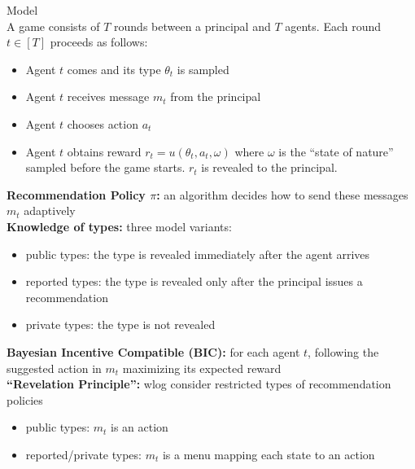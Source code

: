 \documentclass[final]{beamer}
\newlength{\onecolwid}
\begin{document}
\begin{frame}[t]
\begin{columns}[t]
\begin{column}{\onecolwid}
\begin{block}{Model}
~\\
A game consists of $T$ rounds between a principal and $T$ agents. Each round $t \in[T]$ proceeds as follows:
\begin{itemize}
\item Agent $t$ comes and its type $\theta_t$ is sampled
\item Agent $t$ receives message $m_t$ from the principal
\item Agent $t$ chooses action $a_t$
\item Agent $t$ obtains reward $r_t = u(\theta_t ,a_t, \omega)$ where $\omega$ is the ``state of nature'' sampled before the game starts. $r_t$ is revealed to the principal.
\end{itemize}
\textbf{Recommendation Policy $\pi$:} an algorithm decides how to send these messages $m_t$ adaptively\\
\textbf{Knowledge of types:} three model variants:
\begin{itemize}
\item public types: the type is revealed immediately after the agent arrives
\item reported types: the type is revealed only after the principal issues a recommendation
\item private types: the type is not revealed
\end{itemize}
\textbf{Bayesian Incentive Compatible (BIC):} for each agent $t$, following the suggested action in $m_t$ maximizing its expected reward\\
\textbf{``Revelation Principle'':} wlog consider restricted types of recommendation policies
\begin{itemize}
\item public types: $m_t$ is an action
\item reported/private types: $m_t$ is a menu mapping each state to an action
\end{itemize}
\end{block}





\end{column} %


\end{columns}
\end{frame}
\end{document}
